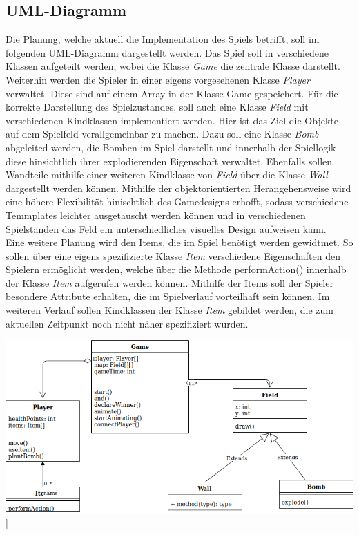 \documentclass[10pt, a4paper]{report}
\begin{document}
	\subsection{UML-Diagramm}
	Die Planung, welche aktuell die Implementation des Spiels betrifft, soll im folgenden UML-Diagramm dargestellt werden. Das Spiel soll in verschiedene Klassen aufgeteilt werden, wobei die Klasse \textit{Game} die zentrale Klasse darstellt. Weiterhin werden die Spieler in einer eigens vorgesehenen Klasse \textit{Player} verwaltet. Diese sind auf einem Array in der Klasse Game gespeichert. Für die korrekte Darstellung des Spielzustandes, soll auch eine Klasse \textit{Field} mit verschiedenen Kindklassen implementiert werden. Hier ist das Ziel die Objekte auf dem Spielfeld verallgemeinbar zu machen. Dazu soll eine Klasse \textit{Bomb} abgeleited werden, die Bomben im Spiel darstellt und innerhalb der Spiellogik diese hinsichtlich ihrer explodierenden Eigenschaft verwaltet. Ebenfalls sollen Wandteile mithilfe einer weiteren Kindklasse von \textit{Field} über die Klasse \textit{Wall} dargestellt werden können. Mithilfe der objektorientierten Herangehensweise wird eine höhere Flexibilität hinischtlich des Gamedesigns erhofft, sodass verschiedene Temmplates leichter ausgetauscht werden können und in verschiedenen Spielständen das Feld ein unterschiedliches visuelles Design aufweisen kann.\\
	Eine weitere Planung wird den Items, die im Spiel benötigt werden gewidtmet. So sollen über eine eigens spezifizierte Klasse \textit{Item} verschiedene Eigenschaften den Spielern ermöglicht werden, welche über die Methode performAction() innerhalb der Klasse \textit{Item} aufgerufen werden können. Mithilfe der Items soll der Spieler besondere Attribute erhalten, die im Spielverlauf vorteilhaft sein können. Im weiteren Verlauf sollen Kindklassen der Klasse \textit{Item} gebildet werden, die zum aktuellen Zeitpunkt noch nicht näher spezifiziert wurden.
	
	\includegraphics[scale=0.4]{UML.png}]
	
\end{document}
